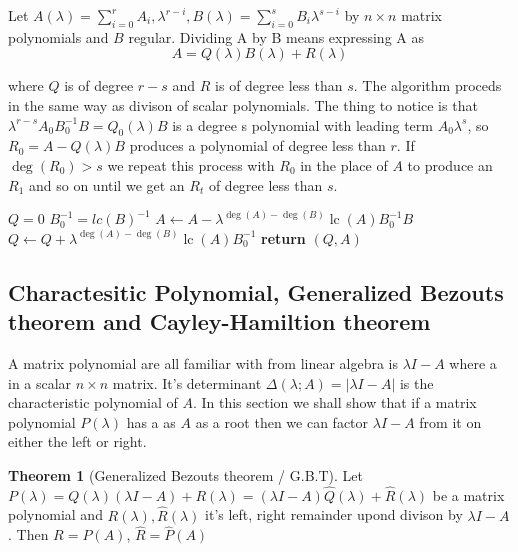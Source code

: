 \documentclass{tufte-book} %
\theoremstyle{definition}
\theoremstyle{theorem}
\newtheorem{theorem}{Theorem}
\theoremstyle{proposition}
\theoremstyle{lemma}
\theoremstyle{corolarry}
\DeclareMathOperator{\lc}{lc}
\begin{document}
  Let $A(\lambda) = \sum_{i=0}^{r} A_i,\lambda^{r-i}, B(\lambda) = \sum_{i=0}^{s} B_i \lambda^{s - i}$ by $n \times n$ matrix polynomials and $B$ regular. Dividing A by B means expressing A as 
  $$ A = Q(\lambda)B(\lambda) + R(\lambda)$$

  where $Q$ is of degree $r-s$ and $R$ is of degree less than $s$. The algorithm proceds in the same way as divison of scalar polynomials. The thing to notice is that $\lambda^{r-s}A_0B_0^{-1}B = Q_0(\lambda)B$ is a degree s polynomial with leading term $A_0 \lambda^s$, so  $R_0 = A - Q(\lambda)B$ produces a polynomial of degree less than $r$.
  If $\deg(R_0) > s$ we repeat this process with $R_0$ in the place of $A$ to produce an $R_1$ and so on until we get an $R_t$ of degree less than $s$.

  \begin{algorithm}[H]
\caption{Left quotient}\label{l_quot}
\begin{algorithmic}[1]
 
\State $Q = 0$
\State $B_0^{-1} = lc(B)^{-1}$
\State $A \gets A - \lambda^{\deg(A)-\deg(B)} \lc(A)B_0^{-1}B$
\State $Q\gets Q + \lambda^{\deg(A)-\deg(B)} \lc(A)B_0^{-1}$
\EndWhile\label{l_quout}
\State \textbf{return} $(Q,A)$
\EndProcedure
\end{algorithmic}
\end{algorithm}

\subsection{Charactesitic Polynomial, Generalized Bezouts theorem and Cayley-Hamiltion theorem}

A matrix polynomial are all familiar with from linear algebra is $\lambda I - A$ where a in a scalar $n \times n $ matrix. 
It's determinant $\Delta(\lambda;A) = |\lambda I - A|$ is the characteristic polynomial of $A$. In this section we shall show that if a matrix polynomial $P(\lambda)$ has a as $A$ as a root then we can factor $\lambda I - A$ from it on either the left or right.

\begin{theorem}[Generalized Bezouts theorem / G.B.T]
  Let $P(\lambda) = Q(\lambda)(\lambda I - A) + R(\lambda) = (\lambda I - A)\hat{Q}(\lambda) + \hat{R}(\lambda) $
  be a matrix polynomial and $R(\lambda), \hat{R}(\lambda)$ it's left, right remainder upond divison by $\lambda I - A$. Then $R = P(A)$, $\hat{R} = \hat{P}(A)$  
\end{theorem}
\end{document}
